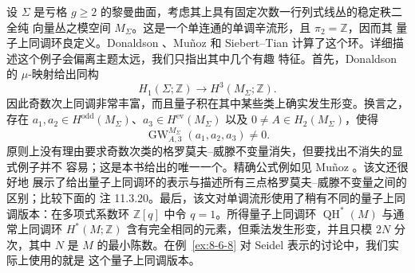 \begin{example}\label{ex:11-1-15}
设 $\Sigma$ 是亏格 $g\ge2$ 的黎曼曲面，考虑其上具有固定次数一行列式线丛的稳定秩二全纯
向量丛之模空间 $M_\Sigma$。这是一个单连通的单调辛流形，且 $\pi_2=\mathbb Z$，因而其
量子上同调环良定义。Donaldson 、Muñoz  和 Siebert--Tian
 计算了这个环。详细描述这个例子会偏离主题太远，我们只指出其中几个有趣
特征。首先，Donaldson 的 $\mu$-映射给出同构
\[
  H_1(\Sigma;\mathbb Z)\longrightarrow H^3(M_\Sigma;\mathbb Z).
\]
因此奇数次上同调非常丰富，而且量子积在其中某些类上确实发生形变。换言之，存在
$a_1,a_2\in H^{\mathrm{odd}}(M_\Sigma)$、$a_3\in H^{\mathrm{ev}}(M_\Sigma)$ 以及
$0\ne A\in H_2(M_\Sigma)$，使得
\[
  \operatorname{GW}_{A,3}^{M_\Sigma}(a_1,a_2,a_3)\ne0.
\]
原则上没有理由要求奇数次类的格罗莫夫--威滕不变量消失，但要找出不消失的显式例子并不
容易；这是本书给出的唯一一个。精确公式例如见 Muñoz 。该文还很好地
展示了给出量子上同调环的表示与描述所有三点格罗莫夫--威滕不变量之间的区别；比较下面的
注 11.3.20。最后，该文对单调流形使用了稍有不同的量子上同调版本：在多项式系数环
$\mathbb Z[q]$ 中令 $q=1$。所得量子上同调环 $\operatorname{QH}^*(M)$ 与通常上同调环
$H^*(M;\mathbb Z)$ 含有完全相同的元素，但乘法发生形变，并且只模 $2N$ 分次，其中 $N$
是 $M$ 的最小陈数。在例~\ref{ex:8-6-8} 对 Seidel 表示的讨论中，我们实际上使用的就是
这个量子上同调版本。
\end{example}

